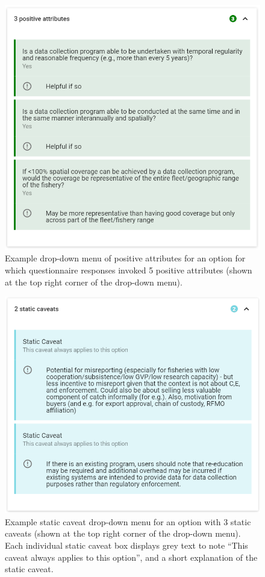 \documentclass[
  11pt,
]{book}
\begin{document}
\begin{figure}

{\centering \includegraphics[width=0.75\linewidth]{images/pos-attr-drop-down} 

}

\caption{Example drop-down menu of positive attributes for an option for which questionnaire responses invoked 5 positive attributes (shown at the top right corner of the drop-down menu).}\label{fig:pos-attr-drop-down}
\end{figure}

\begin{figure}

{\centering \includegraphics[width=0.75\linewidth]{images/static-cav-drop-down} 

}

\caption{Example static caveat drop-down menu for an option with 3 static caveats (shown at the top right corner of the drop-down menu). Each individual static caveat box displays grey text to note “This caveat always applies to this option”, and a short explanation of the static caveat.}\label{fig:static-cav-drop-down}
\end{figure}
\end{document}
